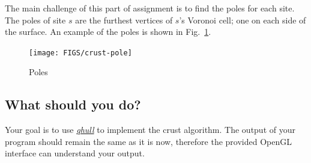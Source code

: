 \documentclass[11pt]{article}
\begin{document}
The main challenge of this part of assignment is to find the poles for each site. The poles
of site $s$ are the furthest vertices of $s$'s Voronoi cell; one on each side of the surface. 
An example of the poles is shown in Fig.~\ref{fig:crust-pole}.


\begin{figure}[ht]
\centering
\begin{minipage}[t]{0.5\linewidth}
\texttt{[image: FIGS/crust-pole]}
\caption{Poles}
\label{fig:crust-pole}
\end{minipage}
\end{figure}


\subsection{What should  you do?}

Your goal is to use \href{http://www.qhull.org/}{\it qhull} to implement the crust algorithm.
The output of your program should remain the same as it is now, therefore
the provided OpenGL interface can understand your output.



%



\end{document}
